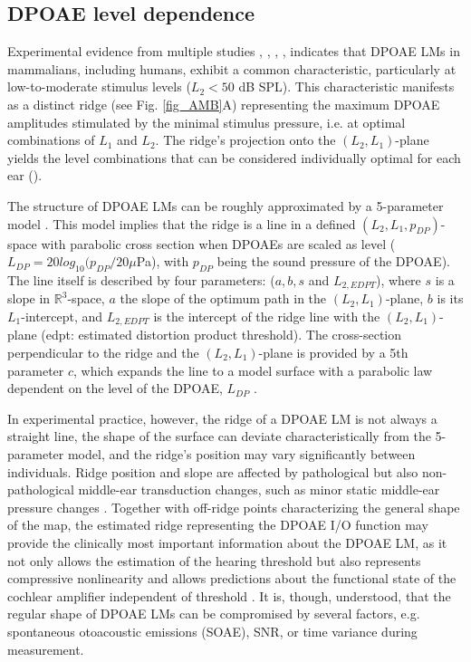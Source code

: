 \documentclass[journal,twoside,web]{ieeecolor2}
\begin{document}
\subsection{DPOAE level dependence}
Experimental evidence from multiple studies \cite{Wh1995}, \cite{Km2000}, \cite{ZD2015a}, \cite{ZD2020}, \cite{Cr1997} indicates that DPOAE LMs in mammalians, including humans, exhibit a common characteristic, particularly at low-to-moderate stimulus levels ($L_2<50$ dB SPL).
This characteristic manifests as a distinct ridge (see Fig. \ref{fig_AMB}A) representing the maximum DPOAE amplitudes stimulated by the minimal stimulus pressure, i.e. at optimal combinations of $L_1$ and $L_2$.
The ridge’s projection onto the $(L_2, L_1)$-plane yields the level combinations that can be considered individually optimal for each ear (\cite{ZD2020}).
 
The structure of DPOAE LMs can be roughly approximated by a 5-parameter model \cite{ED2017}.
This model implies that the ridge is a line in a defined $(L_2, L_1, p_{DP})$-space with parabolic cross section when DPOAEs are scaled as level ($L_{DP}=20 log_{10} (p_{DP}/20 \mu$Pa), with $p_{DP}$ being the sound pressure of the DPOAE).
The line itself is described by four parameters: ($a, b, s$ and $L_{2,EDPT}$), where $s$ is a slope in $\mathbb{R}^3$-space, $a$ the slope of the optimum path in the $(L_2, L_1)$-plane, $b$ is its $L_1$-intercept, and $L_{2,EDPT}$ is the intercept of the ridge line with the $(L_2, L_1)$-plane (edpt: estimated distortion product threshold).
The cross-section perpendicular to the ridge and the $(L_2, L_1)$-plane is provided by a 5th parameter $c$, which expands the line to a model surface with a parabolic law dependent on the level of the DPOAE, $L_{DP}$ \cite{ZD2020}.

In experimental practice, however, the ridge of a DPOAE LM is not always a straight line, the shape of the surface can deviate characteristically from the 5-parameter model, and the ridge’s position may vary significantly between individuals.
Ridge position and slope are affected by pathological but also non-pathological middle-ear transduction changes, such as minor static middle-ear pressure changes \cite{Js2005}.
Together with off-ridge points characterizing the general shape of the map, the estimated ridge representing the DPOAE I/O function may provide the clinically most important information about the DPOAE LM, as it not only allows the estimation of the hearing threshold but also represents compressive nonlinearity and allows predictions about the functional state of the cochlear amplifier independent of threshold \cite{Ab2021}.
It is, though, understood, that the regular shape of DPOAE LMs can be compromised by several factors, e.g. spontaneous otoacoustic emissions (SOAE), SNR, or time variance during measurement.
\end{document}
